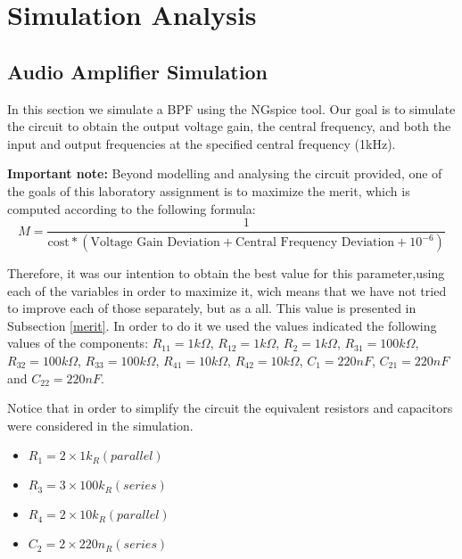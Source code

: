 \section{Simulation Analysis}
\label{sec:simulation}

\subsection{Audio Amplifier Simulation}
\label{subsec:amp_simulation}
\par In this section we simulate a BPF using the NGspice tool. Our goal is to simulate the circuit to obtain the output voltage gain, the central frequency, and both the input and output frequencies at the specified central frequency (1kHz).

\par  \textbf{Important note:} Beyond modelling and analysing the circuit provided, one of the goals of this laboratory assignment is to maximize the merit, which is computed according to the following formula:
\begin{equation}
M = \frac{1}{\text{cost}*(\text{Voltage Gain Deviation}+\text{Central Frequency Deviation}+10^{-6})}
\label{eq:merit}
\end{equation}

\par Therefore, it was our intention to obtain the best value for this parameter,using each of the variables in order to maximize it, wich means that we have not tried to improve each of those separately, but as a all. This value is presented in Subsection \ref{merit}.
In order to do it we used the values indicated the following values of the components: $R_{11}=1k\Omega$, $R_{12}=1k\Omega$, $R_{2}=1k\Omega$, $R_{31}=100k\Omega$, $R_{32}=100k\Omega$, $R_{33}=100k\Omega$, $R_{41}=10k\Omega$, $R_{42}=10k\Omega$, $C_{1}=220nF$, $C_{21}=220nF$ and $C_{22}=220nF$. 

\par Notice that in order to simplify the circuit the equivalent resistors and capacitors were considered in the simulation.
\begin{itemize}
\item $R_{1} = 2 \times 1k_{ R} (parallel)$
\item $R_{3} = 3 \times 100k_{ R} (series)$
\item $R_{4} = 2 \times 10k_{ R} (parallel)$
\item $C_{2} = 2 \times 220n_{ R} (series)$
\end{itemize}

